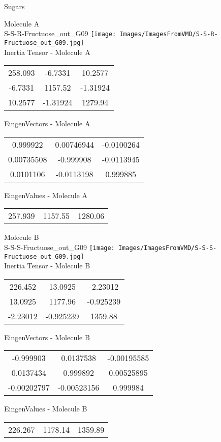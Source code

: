 \vtab[-2cm]
\begin{center}
{\large Sugars}
\end{center}
\begin{multicols}{2}
\begin{center}
Molecule A \\ 
S-S-R-Fructuose\_out\_G09
\texttt{[image: Images/ImagesFromVMD/S-S-R-Fructuose\_out\_G09.jpg]}
\\
Inertia Tensor - Molecule A \\
\vtab
\begin{tabular}{|c c c|}
258.093	 & 	-6.7331	 & 	10.2577	 \\
-6.7331	 & 	1157.52	 & 	-1.31924	 \\
10.2577	 & 	-1.31924	 & 	1279.94
\end{tabular}

\vtab
 EingenVectors - Molecule A     \\
\vtab
\begin{tabular}{|c c c|}
0.999922	 & 	0.00746944	 & 	-0.0100264	 \\
0.00735508	 & 	-0.999908	 & 	-0.0113945	 \\
0.0101106	 & 	-0.0113198	 & 	0.999885
\end{tabular}

\vtab
 EingenValues - Molecule A     \\
\vtab
\begin{tabular}{|c c c|}
257.939	 & 	1157.55	 & 	1280.06
\end{tabular}
\columnbreak

Molecule B \\ 
S-S-S-Fructuose\_out\_G09
\texttt{[image: Images/ImagesFromVMD/S-S-S-Fructuose\_out\_G09.jpg]}
\\
Inertia Tensor - Molecule B \\
\vtab
\begin{tabular}{|c c c|}
226.452	 & 	13.0925	 & 	-2.23012	 \\
13.0925	 & 	1177.96	 & 	-0.925239	 \\
-2.23012	 & 	-0.925239	 & 	1359.88
\end{tabular}

\vtab
 EingenVectors - Molecule B     \\
\vtab
\begin{tabular}{|c c c|}
-0.999903	 & 	0.0137538	 & 	-0.00195585	 \\
0.0137434	 & 	0.999892	 & 	0.00525895	 \\
-0.00202797	 & 	-0.00523156	 & 	0.999984
\end{tabular}

\vtab
 EingenValues - Molecule B     \\
\vtab
\begin{tabular}{|c c c|}
226.267	 & 	1178.14	 & 	1359.89
\end{tabular}

\end{center}
\end{multicols}

